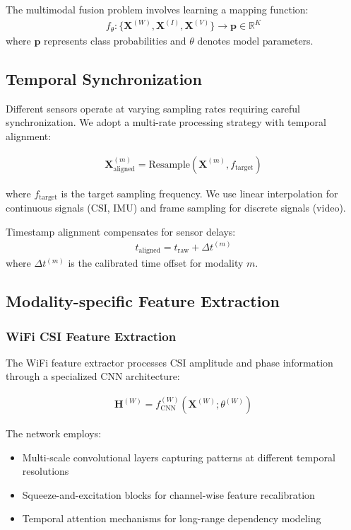 \documentclass[journal]{IEEEtran}
\begin{document}
The multimodal fusion problem involves learning a mapping function:
\begin{align}
f_{\theta}: \{\mathbf{X}^{(W)}, \mathbf{X}^{(I)}, \mathbf{X}^{(V)}\} \rightarrow \mathbf{p} \in \mathbb{R}^K
\end{align}
where $\mathbf{p}$ represents class probabilities and $\theta$ denotes model parameters.

\subsection{Temporal Synchronization}

Different sensors operate at varying sampling rates requiring careful synchronization. We adopt a multi-rate processing strategy with temporal alignment:

\begin{align}
\mathbf{X}^{(m)}_{\text{aligned}} = \text{Resample}(\mathbf{X}^{(m)}, f_{\text{target}})
\end{align}

where $f_{\text{target}}$ is the target sampling frequency. We use linear interpolation for continuous signals (CSI, IMU) and frame sampling for discrete signals (video).

Timestamp alignment compensates for sensor delays:
\begin{align}
t_{\text{aligned}} = t_{\text{raw}} + \Delta t^{(m)}
\end{align}
where $\Delta t^{(m)}$ is the calibrated time offset for modality $m$.

\subsection{Modality-specific Feature Extraction}

\subsubsection{WiFi CSI Feature Extraction}

The WiFi feature extractor processes CSI amplitude and phase information through a specialized CNN architecture:

\begin{align}
\mathbf{H}^{(W)} = f_{\text{CNN}}^{(W)}(\mathbf{X}^{(W)}; \theta^{(W)})
\end{align}

The network employs:
\begin{itemize}
\item Multi-scale convolutional layers capturing patterns at different temporal resolutions
\item Squeeze-and-excitation blocks for channel-wise feature recalibration
\item Temporal attention mechanisms for long-range dependency modeling
\end{itemize}
\end{document}
